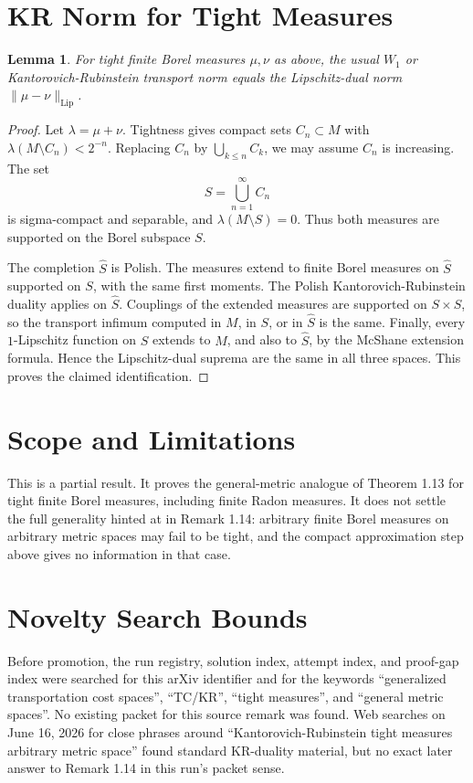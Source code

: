 \documentclass[11pt]{article}
\newtheorem*{lemma}{Lemma}
\newcommand{\Lip}{\operatorname{Lip}}
\begin{document}
\section*{KR Norm for Tight Measures}

\begin{lemma}
For tight finite Borel measures \(\mu,\nu\) as above, the usual \(W_1\) or
Kantorovich-Rubinstein transport norm equals the Lipschitz-dual norm
\(\|\mu-\nu\|_{\Lip}\).
\end{lemma}

\begin{proof}
Let \(\lambda=\mu+\nu\). Tightness gives compact sets \(C_n\subset M\) with
\(\lambda(M\setminus C_n)<2^{-n}\). Replacing \(C_n\) by
\(\bigcup_{k\le n}C_k\), we may assume \(C_n\) is increasing. The set
\[
S=\bigcup_{n=1}^\infty C_n
\]
is sigma-compact and separable, and \(\lambda(M\setminus S)=0\). Thus both
measures are supported on the Borel subspace \(S\).

The completion \(\widehat S\) is Polish. The measures extend to finite Borel
measures on \(\widehat S\) supported on \(S\), with the same first moments.
The Polish Kantorovich-Rubinstein duality applies on \(\widehat S\). Couplings
of the extended measures are supported on \(S\times S\), so the transport
infimum computed in \(M\), in \(S\), or in \(\widehat S\) is the same. Finally,
every \(1\)-Lipschitz function on \(S\) extends to \(M\), and also to
\(\widehat S\), by the McShane extension formula. Hence the Lipschitz-dual
suprema are the same in all three spaces. This proves the claimed
identification.
\end{proof}

\section*{Scope and Limitations}

This is a partial result. It proves the general-metric analogue of Theorem
1.13 for tight finite Borel measures, including finite Radon measures. It does
not settle the full generality hinted at in Remark 1.14: arbitrary finite
Borel measures on arbitrary metric spaces may fail to be tight, and the
compact approximation step above gives no information in that case.

\section*{Novelty Search Bounds}

Before promotion, the run registry, solution index, attempt index, and
proof-gap index were searched for this arXiv identifier and for the keywords
``generalized transportation cost spaces'', ``TC/KR'', ``tight measures'', and
``general metric spaces''. No existing packet for this source remark was found.
Web searches on June 16, 2026 for close phrases around
``Kantorovich-Rubinstein tight measures arbitrary metric space'' found standard
KR-duality material, but no exact later answer to Remark 1.14 in this run's
packet sense.
\end{document}
